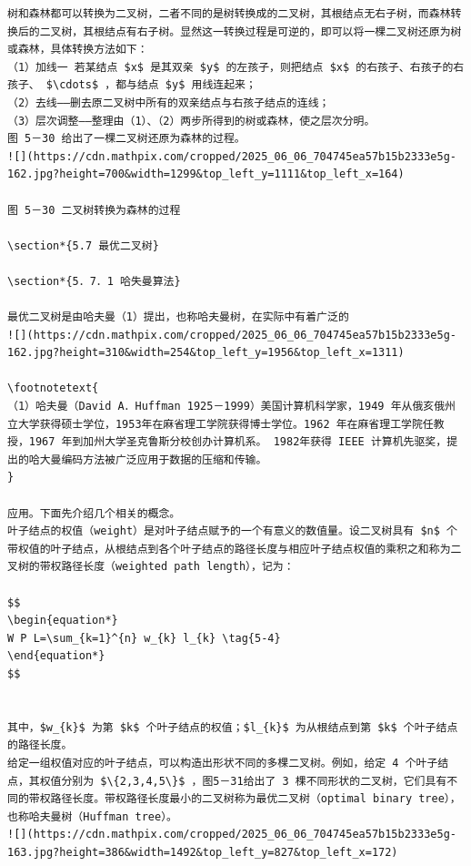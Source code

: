 \documentclass[10pt]{article}
\let\svthefootnote\thefootnote
\newcommand\blfootnotetext[1]{%
  \let\thefootnote\relax\footnote{#1}%
  \addtocounter{footnote}{-1}%
  \let\thefootnote\svthefootnote%
}
\let\svfootnotetext\footnotetext
\renewcommand\footnotetext[2][?]{%
  \if\relax#1\relax%
    \ifnum\value{footnote}=0\blfootnotetext{#2}\else\svfootnotetext{#2}\fi%
  \else%
    \if?#1\ifnum\value{footnote}=0\blfootnotetext{#2}\else\svfootnotetext{#2}\fi%
    \else\svfootnotetext[#1]{#2}\fi%
  \fi
}
\begin{document}
\begin{verbatim}
树和森林都可以转换为二叉树，二者不同的是树转换成的二叉树，其根结点无右子树，而森林转换后的二叉树，其根结点有右子树。显然这一转换过程是可逆的，即可以将一棵二叉树还原为树或森林，具体转换方法如下：
（1）加线一 若某结点 $x$ 是其双亲 $y$ 的左孩子，则把结点 $x$ 的右孩子、右孩子的右孩子、 $\cdots$ ，都与结点 $y$ 用线连起来；
（2）去线——删去原二叉树中所有的双亲结点与右孩子结点的连线；
（3）层次调整——整理由（1）、（2）两步所得到的树或森林，使之层次分明。
图 5－30 给出了一棵二叉树还原为森林的过程。
![](https://cdn.mathpix.com/cropped/2025_06_06_704745ea57b15b2333e5g-162.jpg?height=700&width=1299&top_left_y=1111&top_left_x=164)

图 5－30 二叉树转换为森林的过程

\section*{5.7 最优二叉树}

\section*{5．7．1 哈失曼算法}

最优二叉树是由哈夫曼（1）提出，也称哈夫曼树，在实际中有着广泛的
![](https://cdn.mathpix.com/cropped/2025_06_06_704745ea57b15b2333e5g-162.jpg?height=310&width=254&top_left_y=1956&top_left_x=1311)

\footnotetext{
（1）哈夫曼（David A．Huffman 1925－1999）美国计算机科学家，1949 年从俄亥俄州立大学获得硕士学位，1953年在麻省理工学院获得博士学位。1962 年在麻省理工学院任教授，1967 年到加州大学圣克鲁斯分校创办计算机系。 1982年获得 IEEE 计算机先驱奖，提出的哈大曼编码方法被广泛应用于数据的压缩和传输。
}

应用。下面先介绍几个相关的概念。
叶子结点的权值（weight）是对叶子结点赋予的一个有意义的数值量。设二叉树具有 $n$ 个带权值的叶子结点，从根结点到各个叶子结点的路径长度与相应叶子结点权值的乘积之和称为二叉树的带权路径长度（weighted path length），记为：

$$
\begin{equation*}
W P L=\sum_{k=1}^{n} w_{k} l_{k} \tag{5-4}
\end{equation*}
$$


其中，$w_{k}$ 为第 $k$ 个叶子结点的权值；$l_{k}$ 为从根结点到第 $k$ 个叶子结点的路径长度。
给定一组权值对应的叶子结点，可以构造出形状不同的多棵二叉树。例如，给定 4 个叶子结点，其权值分别为 $\{2,3,4,5\}$ ，图5－31给出了 3 棵不同形状的二叉树，它们具有不同的带权路径长度。带权路径长度最小的二叉树称为最优二叉树（optimal binary tree），也称哈夫曼树（Huffman tree）。
![](https://cdn.mathpix.com/cropped/2025_06_06_704745ea57b15b2333e5g-163.jpg?height=386&width=1492&top_left_y=827&top_left_x=172)


\end{verbatim}
\end{document}
